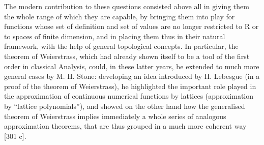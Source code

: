 The modern contribution to these questions consisted above all in giving them the whole range of which they are capable, by bringing them into play for functions whose set of definition and set of values are no longer restricted to R or to spaces of finite dimension, and in placing them thus in their natural framework, with the help of general topological concepts. In particular, the theorem of Weierstrass, which had already shown itself to be a tool of the first order in classical Analysis, could, in these latter years, be extended to much more general cases by M. H. Stone: developing an idea introduced by H. Lebesgue (in a proof of the theorem of Weierstrass), he highlighted the important role played in the approximation of continuous numerical functions by lattices (approximation by ``lattice polynomials''), and showed on the other hand how the generalised theorem of Weierstrass implies immediately a whole series of analogous approximation theorems, that are thus grouped in a much more coherent way {[}301 c{]}.

